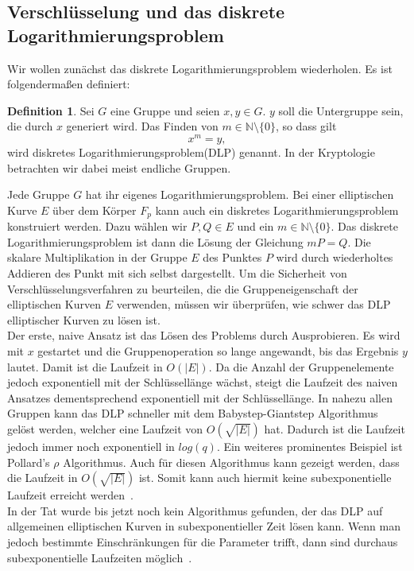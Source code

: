 \documentclass[hidelinks]{article}
\theoremstyle{plain}
\theoremstyle{definition}
\newtheorem{defn}[thm]{Definition}
\theoremstyle{rem}
\begin{document}
\begin{sloppypar}
\subsection{Verschlüsselung und das diskrete Logarithmierungsproblem}
Wir wollen zunächst das diskrete Logarithmierungsproblem wiederholen. Es ist folgendermaßen definiert:
\begin{defn} \label{DLP}
    Sei $G$ eine Gruppe und seien $x,y \in G$. $y$ soll die Untergruppe sein, die durch $x$ generiert wird. Das Finden von $m \in \mathbb{N} \setminus \{0\}$, so dass gilt
    \begin{equation*}
        x^m = y,
    \end{equation*}
    wird diskretes Logarithmierungsproblem(DLP) genannt. In der Kryptologie betrachten wir dabei meist endliche Gruppen.
\end{defn}
Jede Gruppe $G$ hat ihr eigenes Logarithmierungsproblem.
Bei einer elliptischen Kurve $E$ über dem Körper $F_p$ kann auch ein diskretes Logarithmierungsproblem konstruiert werden. Dazu wählen wir $P,Q \in E$ und ein $m \in \mathbb{N} \setminus \{0\}$. Das diskrete Logarithmierungsproblem ist dann die Lösung der Gleichung $mP = Q$. 
Die skalare Multiplikation in der Gruppe $E$ des Punktes $P$ wird durch wiederholtes Addieren des Punkt mit sich selbst dargestellt. 
Um die Sicherheit von Verschlüsselungsverfahren zu beurteilen, die die Gruppeneigenschaft der elliptischen Kurven $E$ verwenden, müssen wir überprüfen, wie schwer das DLP elliptischer Kurven zu lösen ist.\\
\newline
Der erste, naive Ansatz ist das Lösen des Problems durch Ausprobieren. Es wird mit $x$ gestartet und die Gruppenoperation so lange angewandt, bis das Ergebnis $y$ lautet. 
Damit ist die Laufzeit in $O(|E|)$. 
Da die Anzahl der Gruppenelemente jedoch exponentiell mit der Schlüssellänge wächst, steigt die Laufzeit des naiven Ansatzes dementsprechend exponentiell mit der Schlüssellänge.
In nahezu allen Gruppen kann das DLP schneller mit dem Babystep-Giantstep Algorithmus gelöst werden, welcher eine Laufzeit von $O(\sqrt{|E|})$ hat.
Dadurch ist die Laufzeit jedoch immer noch exponentiell in $log(q)$. 
Ein weiteres prominentes Beispiel ist Pollard's $\rho$ Algorithmus. Auch für diesen Algorithmus kann gezeigt werden, dass die Laufzeit in $O(\sqrt{|E|})$ ist. Somit kann auch hiermit keine subexponentielle Laufzeit erreicht werden~\cite[Seite~386]{silverman}. \\
In der Tat wurde bis jetzt noch kein Algorithmus gefunden, der das DLP auf allgemeinen elliptischen Kurven in subexponentieller Zeit lösen kann. Wenn man jedoch bestimmte Einschränkungen für die Parameter trifft, dann sind durchaus subexponentielle Laufzeiten möglich~\cite{joux2011}.

\end{sloppypar}
\end{document}
